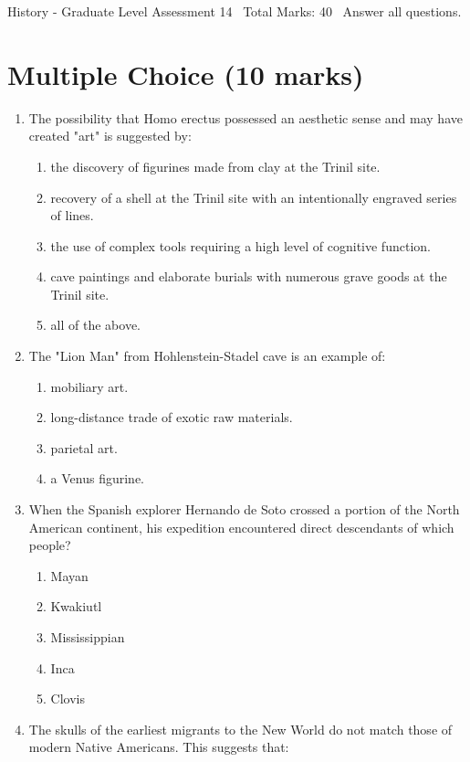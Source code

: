 \documentclass[12pt]{article}
\begin{document}
\begin{center}
History - Graduate Level Assessment 14 \
Total Marks: 40 \
Answer all questions.
\end{center}

\section*{Multiple Choice (10 marks)}
\begin{enumerate}[label=\arabic*.]
\item The possibility that Homo erectus possessed an aesthetic sense and may have created "art" is suggested by:
\begin{enumerate}[label=(\alph*)]
    \item the discovery of figurines made from clay at the Trinil site.
    \item recovery of a shell at the Trinil site with an intentionally engraved series of lines.
    \item the use of complex tools requiring a high level of cognitive function.
    \item cave paintings and elaborate burials with numerous grave goods at the Trinil site.
    \item all of the above.
\end{enumerate}
\item The "Lion Man" from Hohlenstein-Stadel cave is an example of:
\begin{enumerate}[label=(\alph*)]
    \item mobiliary art.
    \item long-distance trade of exotic raw materials.
    \item parietal art.
    \item a Venus figurine.
\end{enumerate}
\item When the Spanish explorer Hernando de Soto crossed a portion of the North American continent, his expedition encountered direct descendants of which people?
\begin{enumerate}[label=(\alph*)]
    \item Mayan
    \item Kwakiutl
    \item Mississippian
    \item Inca
    \item Clovis
\end{enumerate}
\item The skulls of the earliest migrants to the New World do not match those of modern Native Americans. This suggests that:

\end{enumerate}
\end{document}

